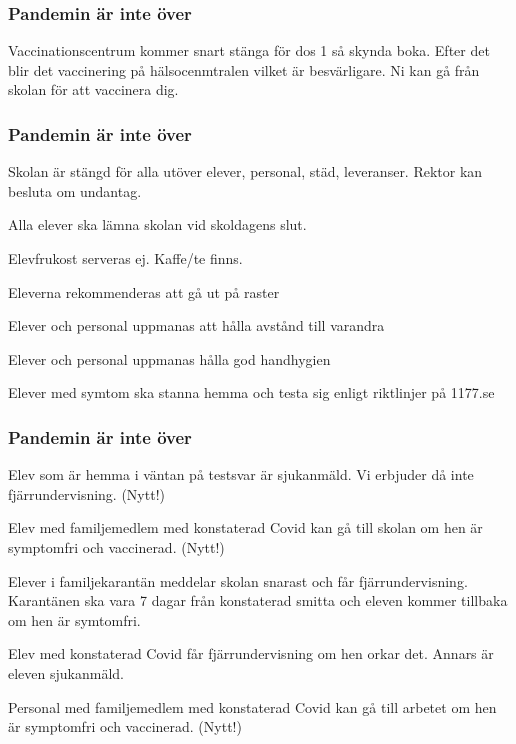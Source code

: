 \documentclass[11pt]{beamer}
\begin{document}
    \begin{frame}
        \frametitle{Pandemin är inte över}
        Vaccinationscentrum kommer snart stänga för dos 1 så skynda boka. Efter det blir det vaccinering på hälsocenmtralen vilket är besvärligare. Ni kan gå från skolan för att vaccinera dig.
    \end{frame}
    \begin{frame}
        \frametitle{Pandemin är inte över}
        \begin{enumeration}
            \item Skolan är stängd för alla utöver elever, personal, städ, leveranser. Rektor kan besluta om undantag.

            \item Alla elever ska lämna skolan vid skoldagens slut.

            \item Elevfrukost serveras ej. Kaffe/te finns.

            \item Eleverna rekommenderas att gå ut på raster

            \item Elever och personal uppmanas att hålla avstånd till varandra

            \item Elever och personal uppmanas hålla god handhygien

            \item Elever med symtom ska stanna hemma och testa sig enligt riktlinjer på 1177.se
        \end{enumeration}
    \end{frame}
    \begin{frame}
        \frametitle{Pandemin är inte över}
        \begin{enumeration}
            \item Elev som är hemma i väntan på testsvar är sjukanmäld. Vi erbjuder då inte fjärrundervisning. (Nytt!)

            \item Elev med familjemedlem med konstaterad Covid kan gå till skolan om hen är symptomfri och vaccinerad. (Nytt!)

            \item Elever i familjekarantän meddelar skolan snarast och får fjärrundervisning. Karantänen ska vara 7 dagar från konstaterad smitta och eleven kommer tillbaka om hen är symtomfri.

            \item Elev med konstaterad Covid får fjärrundervisning om hen orkar det. Annars är eleven sjukanmäld.

            \item Personal med familjemedlem med konstaterad Covid kan gå till arbetet om hen är symptomfri och vaccinerad. (Nytt!)
        \end{enumeration}
    \end{frame}
\end{document}
